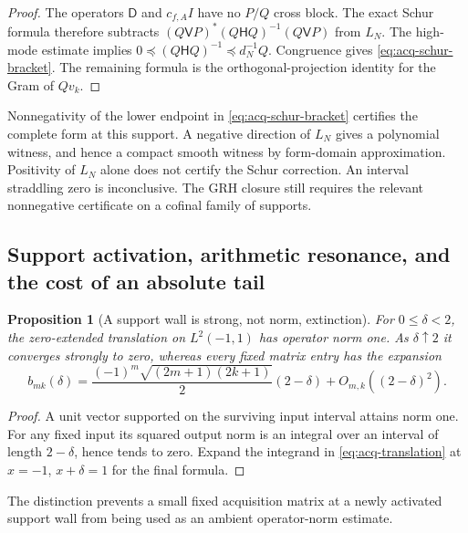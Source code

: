 \documentclass[11pt]{article}
\newtheorem{proposition}[theorem]{Proposition}
\theoremstyle{definition}
\theoremstyle{remark}
\begin{document}
\begin{proof}
The operators $\mathsf D$ and $c_{f,A}I$ have no $P/Q$ cross block.
The exact Schur formula therefore subtracts
$(Q\mathsf VP)^*(Q\mathsf HQ)^{-1}(Q\mathsf VP)$ from $L_N$.
The high-mode estimate implies
$0\preceq(Q\mathsf HQ)^{-1}\preceq d_N^{-1}Q$.
Congruence gives \eqref{eq:acq-schur-bracket}.
The remaining formula is the orthogonal-projection identity for the
Gram of $Qv_k$.
\end{proof}

Nonnegativity of the lower endpoint in \eqref{eq:acq-schur-bracket}
certifies the complete form at this support.  A negative direction of
$L_N$ gives a polynomial witness, and hence a compact smooth witness by
form-domain approximation.  Positivity of $L_N$ alone does not certify
the Schur correction.  An interval straddling zero is inconclusive.
The GRH closure still requires the relevant nonnegative certificate on
a cofinal family of supports.

\subsection{Support activation, arithmetic resonance, and the cost of an absolute tail}
\label{subsec:weil-acquisition-cost}

\begin{proposition}[A support wall is strong, not norm, extinction]
\label{prop:acq-support-wall}
For $0\le\delta<2$, the zero-extended translation on $L^2(-1,1)$ has
operator norm one.  As $\delta\uparrow2$ it converges strongly to zero,
whereas every fixed matrix entry has the expansion
\begin{equation}
 b_{mk}(\delta)=
 \frac{(-1)^m\sqrt{(2m+1)(2k+1)}}2(2-\delta)
 +O_{m,k}((2-\delta)^2).
 \label{eq:acq-support-wall}
\end{equation}
\end{proposition}

\begin{proof}
A unit vector supported on the surviving input interval attains norm one.
For any fixed input its squared output norm is an integral over an
interval of length $2-\delta$, hence tends to zero.  Expand the integrand
in \eqref{eq:acq-translation} at $x=-1$, $x+\delta=1$ for the final formula.
\end{proof}

The distinction prevents a small fixed acquisition matrix at a newly
activated support wall from being used as an ambient operator-norm
estimate.
\end{document}
